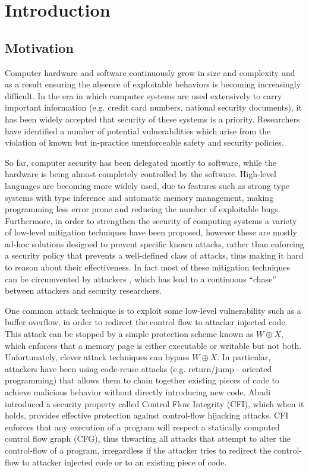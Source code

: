 \chapter{Introduction}\label{ch:introduction}

\section{Motivation}\label{sec:motivation}

Computer hardware and software continuously grow in size and complexity and as a
result ensuring the absence of exploitable behaviors is becoming increasingly
difficult. In the era in which computer systems are used extensively to
carry important information (e.g. credit card numbers, national security
documents), it has been widely accepted that security of these systems is a
priority. Researchers have identified a number of potential vulnerabilities
which arise from the violation of known but in-practice unenforceable safety
and security policies.

So far, computer security has been delegated mostly to software, while
the hardware is being almost completely controlled by the software.
High-level languages are becoming more widely used, due to features
such as strong type systems with type inference and automatic memory
management, making programming less error prone and reducing the
number of exploitable bugs. Furthermore, in order to strengthen the
security of computing systems a variety of low-level mitigation
techniques \cite{Cowan:1998:SAA:1267549.1267554,PaX,Erlingsson07}
have been proposed, however these are mostly ad-hoc solutions designed
to prevent specific known attacks, rather than enforcing a security
policy that prevents a well-defined class of attacks, thus making it
hard to reason about their effectiveness. In fact most of these
mitigation techniques can be circumvented by attackers
\cite{Szekeres2013}, which has lead to a continuous ``chase'' between
attackers and security researchers.

One common attack technique is to exploit some low-level vulnerability
such as a buffer overflow, in order to redirect the control flow to
attacker injected code. This attack can be stopped by a simple
protection scheme known as $W \oplus X$, which enforces that a memory
page is either executable or writable but not both.  Unfortunately,
clever attack techniques can bypass $W \oplus X$. In particular,
attackers have been using code-reuse attacks (e.g. return/jump -
oriented programming) that allows them to chain together existing
pieces of code to achieve malicious behavior without directly
introducing new code.  Abadi~\ETAL\cite{abadi2005} introduced a
security property called Control Flow Integrity (CFI), which when it
holds, provides effective protection against control-flow hijacking
attacks. CFI enforces that any execution of a program will respect a
statically computed control flow graph (CFG), thus thwarting all
attacks that attempt to alter the control-flow of a program,
irregardless if the attacker tries to redirect the control-flow to
attacker injected code or to an existing piece of
code. %

